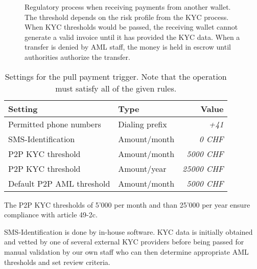 \begin{figure}[h!]
\begin{center}
  \end{center}
  \caption{Regulatory process when receiving payments from another wallet.
    The threshold depends on the risk profile from the KYC process.
    When KYC thresholds would be passed, the receiving wallet cannot
    generate a valid invoice until it has provided the KYC data.
    When a transfer is denied by AML staff, the money is held in escrow
    until authorities authorize the transfer.}
\end{figure}


\begin{table}[h!]
  \caption{Settings for the pull payment trigger. Note that the operation
  must satisfy all of the given rules.}
  \begin{tabular}{l|l|r}
    {\bf Setting}             & {\bf Type}      & {\bf Value}     \\ \hline \hline
    Permitted phone numbers   & Dialing prefix  & {\em +41}       \\
    SMS-Identification        & Amount/month    & {\em     0 CHF} \\
    P2P KYC threshold         & Amount/month    & {\em  5000 CHF} \\
    P2P KYC threshold         & Amount/year     & {\em 25000 CHF} \\
    Default P2P AML threshold & Amount/month    & {\em  5000 CHF} \\
  \end{tabular}
\end{table}

The P2P KYC thresholds of 5'000 \CURRENCY{} per month and than 25'000
\CURRENCY{} per year ensure compliance with article 49-2c.

SMS-Identification is done by in-house software. KYC data is initially
obtained and vetted by one of several external KYC providers before
being passed for manual validation by our own staff who can then
determine appropriate AML thresholds and set review criteria.
